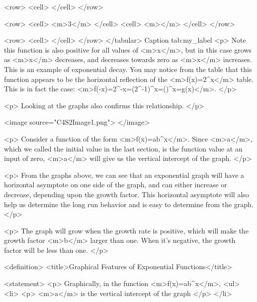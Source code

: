             <row>
                <cell> </cell>
            </row>

            <row>
                <cell> <m>3</m> </cell>
                <cell> <m></m> </cell>
            </row>

            <row>
                <cell> </cell>
            </row>
        </tabular>
        Caption tab:my_label
        <p>
            Note this function is also positive for all values of <m>x</m>, but in this case grows as <m>x</m> decreases, and decreases towards zero as <m>x</m> increases.
            This is an example of exponential decay.
            You may notice from the table that this function appears to be the horizontal reflection of the <m>f(x)=2^{x}</m> table.
            This is in fact the case: <m>f(-x)=2^{-x}=(2^{-1})^{x}=()^{x}=g(x)</m>.
        </p>

        <p>
            Looking at the graphs also confirms this relationship.
        </p>

        <image source="C4S2Image1.png">
        </image>

        <p>
            Consider a function of the form <m>f(x)=ab^{x}</m>.
            Since <m>a</m>, which we called the initial value in the last section, is the function value at an input of zero, <m>a</m> will give us the vertical intercept of the graph.
        </p>

        <p>
            From the graphs above, we can see that an exponential graph will have a horizontal asymptote on one side of the graph, and can either increase or decrease, depending upon the growth factor.
            This horizontal asymptote will also help us determine the long run behavior and is easy to determine from the graph.
        </p>

        <p>
            The graph will grow when the growth rate is positive, which will make the growth factor <m>b</m> larger than one.
            When it’s negative, the growth factor will be less than one.
        </p>

        <definition>
            <title>Graphical Features of Exponential Functions</title>

            <statement>
                <p>
                    Graphically, in the function <m>f(x)=ab^{x}</m>,
                    <ul>
                        <li>
                            <p>
                                <m>a</m> is the vertical intercept of the graph
                            </p>
                        </li>

